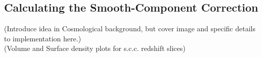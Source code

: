 \documentclass[%
 reprint,
 amsmath,amssymb,
 aps,nofootinbib
]{revtex4-1}
\begin{document}


\subsection{Calculating the Smooth-Component Correction}


(Introduce idea in Cosmological background, but cover image and specific details to implementation here.)\\

(Volume and Surface density plots for s.c.c. redshift slices)

\end{document}

